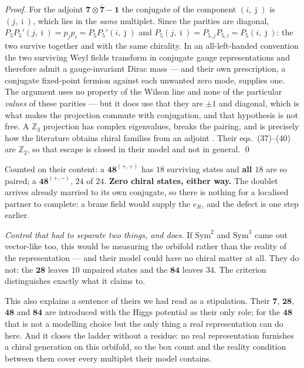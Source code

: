 \documentclass[11pt,a4paper]{article}
\newcommand{\ZZ}{\mathbb{Z}}
\newcommand{\rep}[1]{\mathbf{#1}}
\begin{document}
\begin{proof}
For the adjoint $\rep7\otimes\rep{\bar7}-\rep1$ the conjugate of the component $(i,\bar\jmath)$ is
$(j,\bar\imath)$, which lies in the \emph{same} multiplet. Since the parities are diagonal,
$P_5P_5'(j,\bar\imath)=p_jp_i=P_5P_5'(i,\bar\jmath)$ and
$P_5(j,\bar\imath)=P_{5,j}P_{5,i}=P_5(i,\bar\jmath)$: the two survive together and with the same
chirality. In an all-left-handed convention the two surviving Weyl fields transform in conjugate
gauge representations and therefore admit a gauge-invariant Dirac mass --- and their own
prescription, a conjugate fixed-point fermion against each unwanted zero mode, supplies one. The
argument uses no property of the Wilson line and none of the particular \emph{values} of these
parities --- but it does use that they are $\pm1$ and diagonal, which is what makes the projection
commute with conjugation, and that hypothesis is not free. A $\ZZ_3$ projection has complex
eigenvalues, breaks the pairing, and is precisely how the literature obtains chiral families from an
adjoint \cite{GMN}. Their eqs.~(37)--(40) are $\ZZ_2$, so that escape is closed in their model and
not in general. \qed
\end{proof}

\noindent Counted on their content: a $\rep{48}^{(+,+)}$ has $18$ surviving states and \textbf{all
$18$} are so paired; a $\rep{48}^{(+,-)}$, $24$ of $24$. \textbf{Zero chiral states, either way.} The
doublet arrives already married to its own conjugate, so there is nothing for a localised partner to
complete: a brane field would supply the $e_R$, and the defect is one step earlier.

\emph{Control that had to separate two things, and does.} If $\mathrm{Sym}^2$ and $\mathrm{Sym}^3$
came out vector-like too, this would be measuring the orbifold rather than the reality of the
representation --- and their model could have no chiral matter at all. They do not: the $\rep{28}$
leaves $10$ unpaired states and the $\rep{84}$ leaves $34$. The criterion distinguishes exactly what
it claims to.

This also explains a sentence of theirs we had read as a stipulation. Their $\rep7$, $\rep{28}$,
$\rep{48}$ and $\rep{84}$ are introduced with the Higgs potential as their only role; for the
$\rep{48}$ that is not a modelling choice but the only thing a real representation can do here. And
it closes the ladder without a residue: no real representation furnishes a chiral generation on this
orbifold, so the box count and the reality condition between them cover every multiplet their model
contains.
\end{document}
